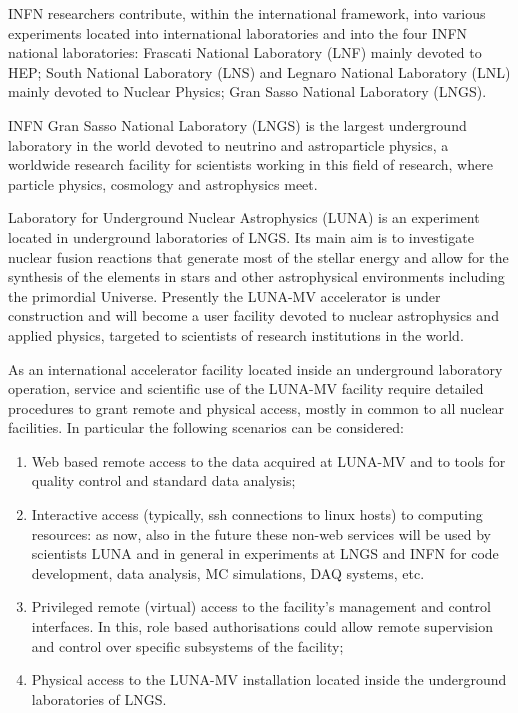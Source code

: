\documentclass[fleqn,11pt]{wlscirep}
\begin{document}
{INFN researchers contribute, within the international framework, into various experiments located into international laboratories and into the four INFN national laboratories: Frascati National Laboratory (LNF) mainly devoted to HEP; South National Laboratory (LNS)  and Legnaro National Laboratory (LNL) mainly devoted to Nuclear Physics; Gran Sasso National Laboratory (LNGS).

INFN Gran Sasso National Laboratory (LNGS) is the largest underground laboratory in the world devoted to neutrino and astroparticle physics, a worldwide research facility for scientists working in this field of research, where particle physics, cosmology and astrophysics meet.

Laboratory for Underground Nuclear Astrophysics (LUNA) is an experiment located in underground laboratories of LNGS. Its main aim is to investigate nuclear fusion reactions that generate most of the stellar energy and allow for the synthesis of the elements in stars and other astrophysical environments including the primordial Universe. Presently the LUNA-MV accelerator is under construction and will become a user facility devoted to nuclear astrophysics and applied physics, targeted to scientists of research institutions in the world.

As an international accelerator facility located inside an underground laboratory operation, service and scientific use of the LUNA-MV facility require detailed procedures to grant remote and physical access, mostly in common to all nuclear facilities. In particular the following scenarios can be considered:
\begin{enumerate}
\item Web based remote access to the data acquired at LUNA-MV and to tools for quality control and standard data analysis;
\item Interactive access (typically, ssh connections to linux hosts) to computing resources: as now,  also in the future these non-web services will be used by scientists LUNA and in general in experiments at LNGS and INFN for code development, data analysis, MC simulations, DAQ systems, etc.
\item Privileged remote (virtual) access to the facility’s management and control interfaces. In this, role based authorisations could allow remote supervision and control over specific subsystems of the facility;
\item Physical access to the LUNA-MV installation located inside the underground laboratories of LNGS.
\end{enumerate}

}
\end{document}
